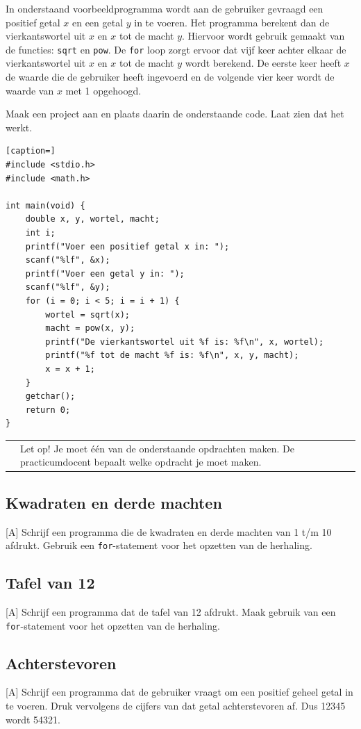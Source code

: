 \documentclass[a4paper,10pt,fleqn,twoside]{article}
\newcommand{\letop}{%
\vspace{4ex plus 1ex minus 1ex}
\begin{mdframed}[outerlinewidth = 1 ,%
roundcorner = 4 pt,%
leftmargin = 40,%
rightmargin = 40,%
backgroundcolor = yellow!40,%
outerlinecolor = red!70!black,%
innertopmargin = \topskip,%
splittopskip = \topskip,%
]
\begin{tabularx}{\linewidth}{m{1cm}X}
\Large\leftpointright & Let op! Je moet één van de onderstaande opdrachten maken. De practicumdocent bepaalt welke opdracht je moet maken.
\end{tabularx}
\end{mdframed}
\vspace{4ex plus 1ex minus 1ex}
}
\begin{document}
In onderstaand voorbeeldprogramma wordt aan de gebruiker gevraagd een positief getal $x$ en een getal $y$ in te voeren. Het programma berekent dan de vierkantswortel uit $x$ en $x$ tot de macht $y$. Hiervoor wordt gebruik gemaakt van de functies: \lstinline|sqrt| en \lstinline|pow|. De \lstinline|for| loop zorgt ervoor dat vijf keer achter elkaar de vierkantswortel uit $x$ en $x$ tot de macht $y$ wordt berekend. De eerste keer heeft $x$ de waarde die de gebruiker heeft ingevoerd en de volgende vier keer wordt de waarde van $x$ met 1 opgehoogd.

Maak een project aan en plaats daarin de onderstaande code. Laat zien dat het werkt.

\begin{lstlisting}[caption=]
#include <stdio.h>
#include <math.h>

int main(void) {
    double x, y, wortel, macht;
    int i;
    printf("Voer een positief getal x in: ");
    scanf("%lf", &x);
    printf("Voer een getal y in: ");
    scanf("%lf", &y);
    for (i = 0; i < 5; i = i + 1) {
        wortel = sqrt(x);
        macht = pow(x, y);
        printf("De vierkantswortel uit %f is: %f\n", x, wortel);
        printf("%f tot de macht %f is: %f\n", x, y, macht);
        x = x + 1;
    }
    getchar();
    return 0;
}
\end{lstlisting}

\letop
\clearpage

\subsection{Kwadraten en derde machten}[A]
Schrijf een programma die de kwadraten en derde machten van 1 t/m 10 afdrukt. Gebruik een \lstinline|for|-statement voor het opzetten van de herhaling.

\subsection{Tafel van 12}[A]
Schrijf een programma dat de tafel van 12 afdrukt. Maak gebruik van een \lstinline|for|-statement voor het opzetten van de herhaling.

\subsection{Achterstevoren}[A]
Schrijf een programma dat de gebruiker vraagt om een positief geheel getal in te voeren. Druk vervolgens de cijfers van dat getal achterstevoren af. Dus 12345 wordt 54321.
\end{document}
